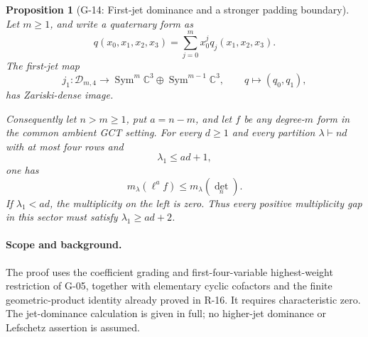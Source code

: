 \documentclass[11pt,a4paper]{article}
\newtheorem{proposition}{Proposition}
\theoremstyle{definition}\newtheorem{definition}{Definition}
\begin{document}
\begin{proposition}[G-14: First-jet dominance and a stronger padding boundary]\label{G-14}
Let $m\geq1$, and write a quaternary form as
\[
 q(x_0,x_1,x_2,x_3)=\sum_{j=0}^m x_0^j q_j(x_1,x_2,x_3).
\]
The first-jet map
\[
 j_1:\mathcal D_{m,4}\longrightarrow
   \operatorname{Sym}^m\mathbb C^3\oplus
   \operatorname{Sym}^{m-1}\mathbb C^3,
 \qquad q\longmapsto(q_0,q_1),
\]
has Zariski-dense image.

Consequently let $n>m\geq1$, put $a=n-m$, and let $f$ be
any degree-$m$ form in the common ambient GCT setting.
For every $d\geq1$ and every partition $\lambda\vdash nd$
with at most four rows and
\begin{equation}\label{G14:boundary}
 \lambda_1\leq ad+1,
\end{equation}
one has
\[
 m_\lambda(\ell^a f)\leq m_\lambda(\det_n).
\]
If $\lambda_1<ad$, the multiplicity on the left is zero.
Thus every positive multiplicity gap in this sector must
satisfy $\lambda_1\geq ad+2$.
\end{proposition}

\paragraph{Scope and background.}
The proof uses the coefficient grading and first-four-variable
highest-weight restriction of G-05, together with elementary
cyclic cofactors and the finite geometric-product identity
already proved in R-16. It requires characteristic zero.
The jet-dominance calculation is given in full; no higher-jet
dominance or Lefschetz assertion is assumed.
\end{document}
